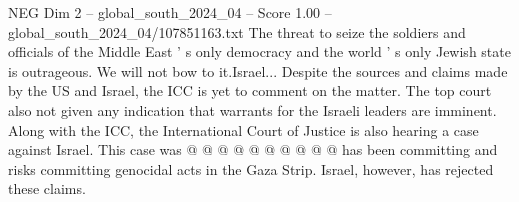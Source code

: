 \begin{textsample}{NEG Dim 2 – global\_south\_2024\_04 – Score 1.00 – global\_south\_2024\_04/107851163.txt}
The threat to seize the soldiers and officials of the Middle East ' s only democracy and the world ' s only Jewish state is outrageous.
We will not bow to it.Israel...
Despite the sources and claims made by the US and Israel, the ICC is yet to comment on the matter.
The top court also not given any indication that warrants for the Israeli leaders are imminent.
Along with the ICC, the International Court of Justice is also hearing a case against Israel.
This case was @ @ @ @ @ @ @ @ @ @ has been committing and risks committing genocidal acts in the Gaza Strip.
Israel, however, has rejected these claims.

\end{textsample}
